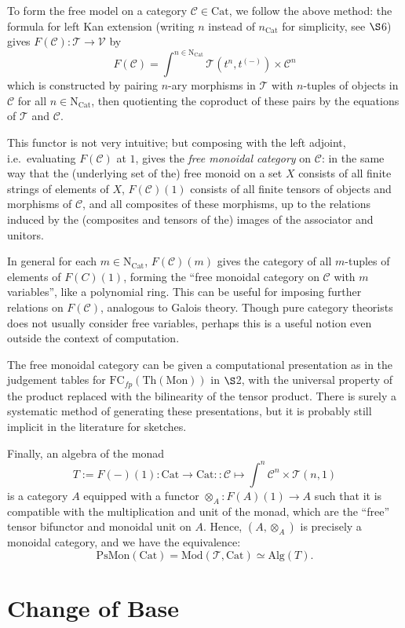 \documentclass{amsart}
\theoremstyle{definition}
\newcommand{\Th}{\mathrm{Th}}
\newcommand{\Cat}{\mathrm{Cat}}
\newcommand{\Mon}{\mathrm{Mon}}
\newcommand{\Mod}{\mathrm{Mod}}
\newcommand{\FC}{\mathrm{FC}}
\newcommand{\NN}{\mathrm{N}}
\newcommand{\V}{\mathscr{V}}
\newcommand{\C}{\mathscr{C}}
\newcommand{\T}{\mathscr{T}}
\newcommand{\maps}{\colon}
\begin{document}
To form the free model on a category $\C\in \Cat$, we follow the above method: the formula for left Kan extension (writing $n$ instead of $n_\Cat$ for simplicity, see $\S$6) gives $F(\C)\maps \T\to \V$ by $$F(\C) = \int^{n\in \NN_\Cat} \T(t^{n},t^{(-)})\times \C^{n}$$ which is constructed by pairing $n$-ary morphisms in $\T$ with $n$-tuples of objects in $\C$ for all $n\in \NN_\Cat$, then quotienting the coproduct of these pairs by the equations of $\T$ and $\C$.

This functor is not very intuitive; but composing with the left adjoint, i.e.\ evaluating $F(\C)$ at $1$, gives the \textit{free monoidal category} on $\C$: in the same way that the (underlying set of the) free monoid on a set $X$ consists of all finite strings of elements of $X$, $F(\C)(1)$ consists of all finite tensors of objects and morphisms of $\C$, and all composites of these morphisms, up to the relations induced by the (composites and tensors of the) images of the associator and unitors.

In general for each $m\in \NN_\Cat$, $F(\C)(m)$ gives the category of all $m$-tuples of elements of $F(C)(1)$, forming the ``free monoidal category on $\C$ with $m$ variables'', like a polynomial ring. This can be useful for imposing further relations on $F(\C)$, analogous to Galois theory. Though pure category theorists does not usually consider free variables, perhaps this is a useful notion even outside the context of computation.

The free monoidal category can be given a computational presentation as in the judgement tables for $\FC_{fp}(\Th(\Mon))$ in $\S$2, with the universal property of the product replaced with the bilinearity of the tensor product. There is surely a systematic method of generating these presentations, but it is probably still implicit in the literature for sketches.

Finally, an algebra of the monad $$T:= F(-)(1)\maps \Cat\to \Cat :: \C \mapsto \int^n \C^n \times \T(n,1)$$ is a category $A$ equipped with a functor $\otimes_A\maps F(A)(1)\to A$ such that it is compatible with the multiplication and unit of the monad, which are the ``free'' tensor bifunctor and monoidal unit on $A$. Hence, $(A,\otimes_A)$ is precisely a monoidal category, and we have the equivalence: $$\mathrm{PsMon}(\Cat) = \Mod(\T,\Cat) \simeq \mathrm{Alg}(T).$$

\section{Change of Base}
\end{document}
